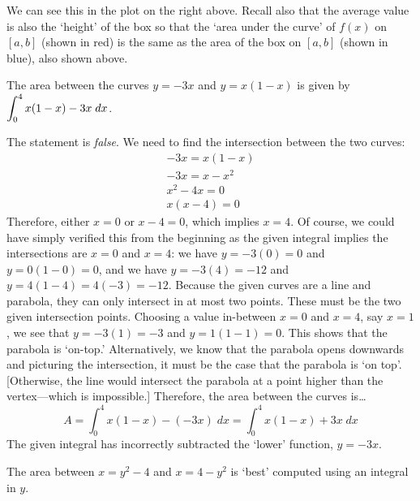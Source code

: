 \documentclass[11pt,letterpaper]{article}
\begin{document}
We can see this in the plot on the right above. Recall also that the average value is also the `height' of the box so that the `area under the curve' of $f(x)$ on $[a, b]$ (shown in red) is the same as the area of the box on $[a, b]$ (shown in blue), also shown above. 



\newpage



 The area between the curves $y= -3x$ and $y= x(1 - x)$ is given by $\displaystyle\int_0^4 x(1 - x) - 3x \;dx$. \pspace

\sol The statement is \textit{false}. We need to find the intersection between the two curves:
	\[
	\begin{gathered}
	-3x= x(1 - x) \\
	-3x= x - x^2 \\
	x^2 - 4x= 0 \\
	x(x - 4)= 0
	\end{gathered}
	\]
Therefore, either $x= 0$ or $x - 4= 0$, which implies $x= 4$. Of course, we could have simply verified this from the beginning as the given integral implies the intersections are $x= 0$ and $x= 4$: we have $y= - 3(0)= 0$ and $y= 0(1 - 0)= 0$, and we have $y= -3(4)= -12$ and $y= 4(1 - 4)= 4(-3)= -12$. Because the given curves are a line and parabola, they can only intersect in at most two points. These must be the two given intersection points. Choosing a value in-between $x= 0$ and $x= 4$, say $x= 1$, we see that $y= -3(1)= -3$ and $y= 1(1 - 1)= 0$. This shows that the parabola is `on-top.' Alternatively, we know that the parabola opens downwards and picturing the intersection, it must be the case that the parabola is `on top'. [Otherwise, the line would intersect the parabola at a point higher than the vertex---which is impossible.] Therefore, the area between the curves is\dots
	\[
	A= \int_0^4 x(1 - x) - (-3x) \;dx= \int_0^4 x(1 - x) + 3x \;dx
	\] 
The given integral has incorrectly subtracted the `lower' function, $y= -3x$. \pvspace{1.3cm}



 The area between $x= y^2 - 4$ and $x= 4 - y^2$ is `best' computed using an integral in $y$. \pspace
\end{document}
